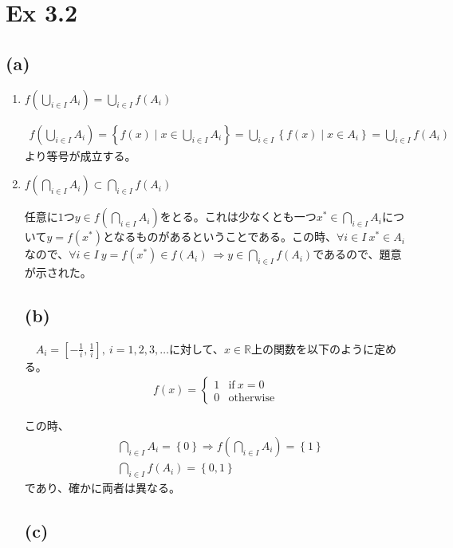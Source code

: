 \documentclass{article}
\begin{document}
\section{Ex 3.2}
\subsection{(a)}
\begin{enumerate}
	\item $f\left( \bigcup_{i \in I} A_i \right) = \bigcup_{i\in I} f\left( A_i \right)$
	
	\begin{align*}
		f\left( \bigcup_{i \in I} A_i \right) = \left\{ f(x)\mid x \in \bigcup_{i \in I } A_i \right\} = \bigcup_{i\in I} \left\{ f(x)\mid x \in A_i \right\} = \bigcup_{i\in I} f\left( A_i \right)
	\end{align*}
	より等号が成立する。
	
	\item $f\left( \bigcap_{i \in I} A_i \right) \subset \bigcap_{i\in I} f\left( A_i \right)$
	
	任意に$1$つ$y \in f\left( \bigcap_{i \in I} A_i \right)$をとる。これは少なくとも一つ$x^* \in \bigcap_{i \in I} A_i$について$y = f(x^*)$となるものがあるということである。この時、$\forall i \in I\ x^* \in A_i$なので、$\forall i\in I\ y = f(x^*)\in f\left( A_i \right)\ \Rightarrow y \in \bigcap_{i \in I} f\left( A_i \right)$であるので、題意が示された。

\subsection{(b)}
　$A_i = \left[ -\frac{1}{i}, \frac{1}{i} \right],\ i = 1,2,3,\dots$に対して、$x \in \mathbb{R}$上の関数を以下のように定める。
\begin{align*}
	f(x) = \begin{cases}
	1 & \text{if}\ x = 0 \\
	0 & \text{otherwise}
	\end{cases}
\end{align*}

この時、
\begin{align*}
	&\bigcap_{i\in I} A_i = \left\{ 0 \right\} \Rightarrow f\left( \bigcap_{i\in I} A_i \right) = \left\{ 1 \right\} \\
	&\bigcap_{i \in I} f\left( A_i \right) = \left\{ 0,1 \right\}
\end{align*}
であり、確かに両者は異なる。

\subsection{(c)}
\end{enumerate}
\end{document}

